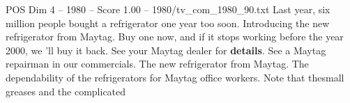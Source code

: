 \begin{textsample}{POS Dim 4 – 1980 – Score 1.00 – 1980/tv\_com\_1980\_90.txt}  \label{ex:f4_pos_067}
Last year, six million people bought a refrigerator one year too soon.
Introducing the new refrigerator from Maytag.
Buy one now, and if it stops working before the year 2000, we 'll buy it back.
See your Maytag dealer for \textbf{details}.
See a Maytag repairman in our commercials.
The new refrigerator from Maytag.
The dependability of the refrigerators for Maytag office workers.
Note that thesmall greases and the complicated

\end{textsample}
